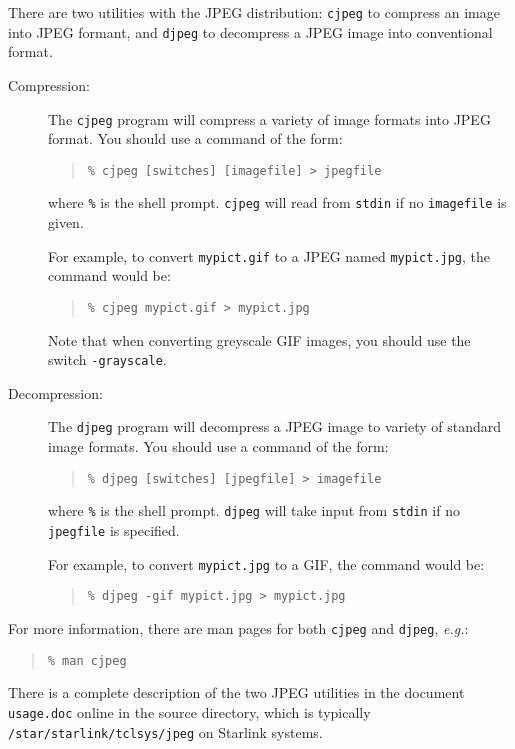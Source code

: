There are two utilities with the JPEG distribution: {\tt{cjpeg}} to compress
an image into JPEG formant, and {\tt{djpeg}} to decompress a JPEG image into
conventional format.

\begin{description}

\item[Compression:]  The {\tt{cjpeg}} program will compress a variety of
image formats into JPEG format.  You should use a command of the form:

\begin{quote}
{\tt \% cjpeg [switches] [imagefile] > jpegfile}
\end{quote}

where {\tt{\%}} is the shell prompt.  {\tt{cjpeg}} will read from {\tt{stdin}}
if no {\tt{imagefile}} is given.  

For example, to convert {\tt{mypict.gif}}
to a JPEG named {\tt{mypict.jpg}}, the command would be:

\begin{quote}
{\tt \% cjpeg mypict.gif > mypict.jpg}
\end{quote}

Note that when converting greyscale GIF images, you should use the switch
{\tt{-grayscale}}.

\item[Decompression:] The {\tt{djpeg}} program will decompress a JPEG image
to variety of standard image formats.  You should use a command of the form:

\begin{quote}
{\tt \% djpeg [switches] [jpegfile] > imagefile}
\end{quote}

where {\tt{\%}} is the shell prompt.  {\tt{djpeg}} will take input from
{\tt{stdin}} if no {\tt{jpegfile}} is specified.

For example, to convert {\tt{mypict.jpg}} to a GIF, the command would be:

\begin{quote}
{\tt \% djpeg -gif mypict.jpg > mypict.jpg}
\end{quote}

\end{description}

For more information, there are man pages for both {\tt{cjpeg}} and 
{\tt{djpeg}}, {\em{e.g.}}:

\begin{quote}
{\tt \% man cjpeg}
\end{quote}

There is a complete description of the two JPEG utilities in the document
{\tt{usage.doc}} online in the source directory, which is typically
{\tt{/star/starlink/tclsys/jpeg}} on Starlink systems.


